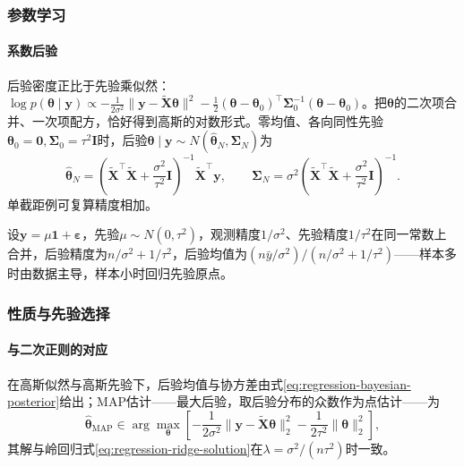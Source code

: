 \subsubsection{参数学习}
\label{sec:regression-bayesian-linear-learning}

\paragraph{系数后验}

后验密度正比于先验乘似然：$\log p(\bm{\theta}\mid\bm{y})\propto-\frac1{2\sigma^2}\lVert\bm{y}-\widetilde{\bm{X}}\bm{\theta}\rVert^2-\frac12(\bm{\theta}-\bm{\theta}_0)^{\top}\bm{\Sigma}_0^{-1}(\bm{\theta}-\bm{\theta}_0)$。把$\bm{\theta}$的二次项合并、一次项配方，恰好得到高斯的对数形式。零均值、各向同性先验$\bm{\theta}_0=\bm 0,\bm{\Sigma}_0=\tau^2\bm I$时，后验$\bm{\theta}\mid\bm{y}\sim N(\widehat{\bm{\theta}}_N,\bm{\Sigma}_N)$为
\begin{equation}
  \widehat{\bm{\theta}}_N
  =\left(\widetilde{\bm{X}}^{\top}\widetilde{\bm{X}}+\frac{\sigma^2}{\tau^2}\bm{I}\right)^{-1}
    \widetilde{\bm{X}}^{\top}\bm{y},
  \qquad
  \bm{\Sigma}_N
  =\sigma^2\left(\widetilde{\bm{X}}^{\top}\widetilde{\bm{X}}+\frac{\sigma^2}{\tau^2}\bm{I}\right)^{-1}.
  \label{eq:regression-bayesian-posterior}
\end{equation}
单截距例可复算精度相加。

设$\bm{y}=\mu\mathbf 1+\bm{\varepsilon}$，先验$\mu\sim N(0,\tau^2)$，观测精度$1/\sigma^2$、先验精度$1/\tau^2$在同一常数上合并，后验精度为$n/\sigma^2+1/\tau^2$，后验均值为$(n\bar y/\sigma^2)/(n/\sigma^2+1/\tau^2)$——样本多时由数据主导，样本小时回归先验原点。

\subsubsection{性质与先验选择}
\label{sec:regression-bayesian-linear-theory}

\paragraph{与二次正则的对应}

\begin{theorem}[高斯先验下的线性后验]
\label{thm:regression-bayesian-linear}
在高斯似然与高斯先验下，后验均值与协方差由式\eqref{eq:regression-bayesian-posterior}给出；MAP估计——最大后验，取后验分布的众数作为点估计——为
\begin{equation}
  \widehat{\bm{\theta}}_{\mathrm{MAP}}
  \in\arg\max_{\bm{\theta}}
  \left[-\frac{1}{2\sigma^2}\lVert\bm{y}-\tilde{\bm{X}}\bm{\theta}\rVert_2^2
    -\frac{1}{2\tau^2}\lVert\bm{\theta}\rVert_2^2\right],
  \label{eq:regression-map}
\end{equation}
其解与岭回归式\eqref{eq:regression-ridge-solution}在$\lambda=\sigma^2/(n\tau^2)$时一致。
\end{theorem}

